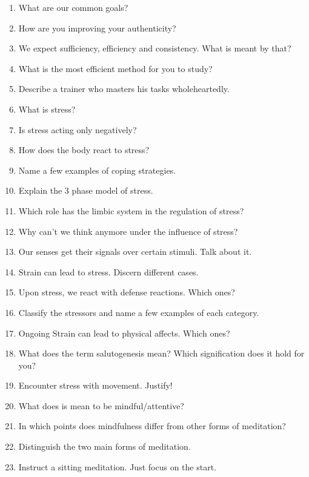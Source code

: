 \documentclass[../main.tex]{subfiles}
\begin{document}
\begin{enumerate}
\item What are our common goals?
\item How are you improving your authenticity?
\item We expect sufficiency, efficiency and consistency. What is meant by that?
\item What is the most efficient method for you to study?
\item Describe a trainer who masters his tasks wholeheartedly.
  \vspace{0.4cm}
\item What is stress?
\item  Is stress acting only negatively?
\item How does the body react to stress?
\item Name a few examples of coping strategies.
\item Explain the 3 phase model of stress.
\item Which role has the limbic system in the regulation of stress?
  \vspace{0.4cm}
\item Why can't we think anymore under the influence of stress?
\item  Our senses get their signals over certain stimuli. Talk about it.
\item Strain can lead to stress. Discern different cases.
\item Upon stress, we react with defense reactions. Which ones?
  \vspace{0.4cm}
\item Classify the stressors and name a few examples of each category.
\item Ongoing Strain can lead to physical affects. Which ones?
  \vspace{0.4cm}
\item What does the term salutogenesis mean? Which signification does it hold for you?
  \vspace{0.4cm}
\item Encounter stress with movement. Justify!
  \vspace{0.4cm}
\item What does is mean to be mindful/attentive?
\item In which points does mindfulness differ from other forms of meditation?
\item Distinguish the two main forms of meditation.
\item Instruct a sitting meditation. Just focus on the start.

\end{enumerate}
\end{document}
